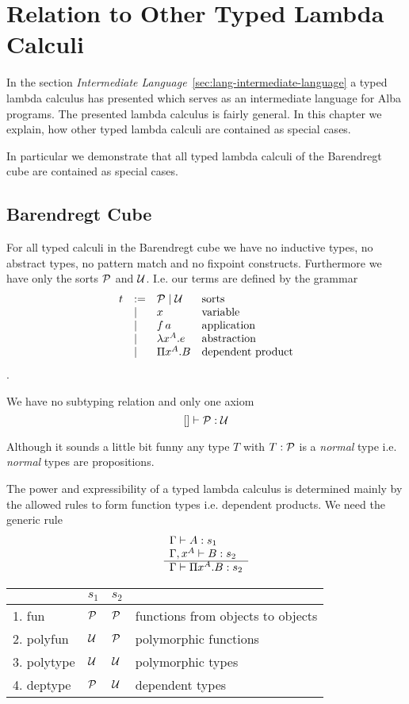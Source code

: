 \section{Relation to Other Typed Lambda Calculi}
\label{sec:lang-other-typed}


In the section \emph{Intermediate
  Language}~\ref{sec:lang-intermediate-language} a typed lambda calculus has
presented which serves as an intermediate language for Alba programs. The
presented lambda calculus is fairly general. In this chapter we explain, how
other typed lambda calculi are contained as special cases.

In particular we demonstrate that all typed lambda calculi of the Barendregt
cube are contained as special cases.


\subsection{Barendregt Cube}

For all typed calculi in the Barendregt cube we have no inductive types, no
abstract types, no pattern match and no fixpoint constructs. Furthermore we
have only the sorts ${\cal{P}}$ and ${\cal{U}}$. I.e. our terms
are defined by the grammar
$$
\begin{array}{lllll}
  t &:= & {\cal{P}} \mid {\cal{U}}  & \text{sorts}
  \\
    & \mid & x & \text{variable}
  \\
    & \mid & f \, a & \text{application}
  \\
    & \mid & \lambda x^A. e & \text{abstraction}
  \\
    & \mid & \Pi x^A.B & \text{dependent product}
\end{array}
$$.

We have no subtyping relation and only one axiom
$$
 [] \vdash {\cal{P}} : {\cal{U}}
$$

Although it sounds a little bit funny any type $T$ with $ T : {\cal{P}}$ is a
\emph{normal} type i.e. \emph{normal} types are propositions.

The power and expressibility of a typed lambda calculus is determined mainly
by the allowed rules to form function types i.e. dependent products. We need
the generic rule
$$
\begin{array}{l} 
  \Gamma \vdash A : s_1
  \\
  \Gamma, x^A \vdash B : s_2
 \\ \hline  \Gamma \vdash \Pi x^A . B : s_2\end{array}
$$

\begin{tabular}{| l | l | l | l |}
  \hline
  & $s_1$ & $s_2$ &
  \\
  \hline
  1. fun       & ${\cal{P}}$ & ${\cal{P}}$ & functions from objects to objects
  \\
  2. polyfun   & ${\cal{U}}$  & ${\cal{P}}$ & polymorphic functions
  \\
  3. polytype  & ${\cal{U}}$  & ${\cal{U}}$  & polymorphic types
  \\
  4. deptype   & ${\cal{P}}$ & ${\cal{U}}$  & dependent types
  \\
  \hline
\end{tabular}

